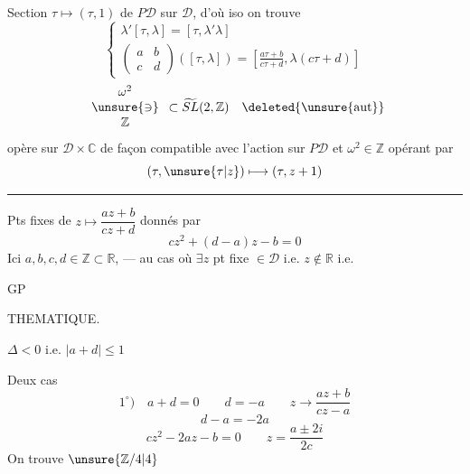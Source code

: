 Section $\tau\longmapsto(\tau,1)$ de $P\mathcal D$ sur $\mathcal D$, d'où iso
on trouve
\[
\left\{\begin{gathered}
\lambda'[\tau,\lambda]=[\tau,\lambda'\lambda]\\
\begin{pmatrix}a&b\\c&d\end{pmatrix}([\tau,\lambda])=\left[\frac{a\tau+b}{c\tau+d},\lambda(c\tau+d)\right]
\end{gathered}\right.
\]
\[
\begin{array}{c}\omega^2\\\unsure{\ni}\\\mathbb Z\end{array}\subset\widetilde{SL}(2,\mathbb Z)\quad\deleted{\unsure{\text{aut}}}
\]
opère sur $\mathcal D\times\mathbb C$ de façon compatible avec l'action sur $P\mathcal D$ et $\omega^2\in\mathbb Z$ opérant par
\[(\tau,\unsure{\tau|z})\longmapsto(\tau,z+1)\]
\rule{\linewidth}{.4pt}

Pts fixes de $z\longmapsto\dfrac{az+b}{cz+d}$ donnés par
\[cz^2+(d-a)z-b=0\]
Ici $a,b,c,d\in\mathbb Z\subset\mathbb R$, ---  \deleted{$\Delta\Leftarrow$} au cas où $\exists z$ pt fixe $\in\mathcal D$ i.e. $z\notin\mathbb R$ i.e.

GP

THEMATIQUE.

\quad$\Delta<0$ i.e. $|a+d|\leq1$

Deux cas\quad{}
\[
1^\circ)\quad a+d=0\qquad d=-a\qquad z\longrightarrow\frac{az+b}{cz-a}
\]
\[d-a=-2a\]
\[
cz^2-2az-b=0\qquad z=\frac{a\pm2i}{2c}
\]
On trouve \textcircled{$\unsure{\mathbb Z/4|4}$}

